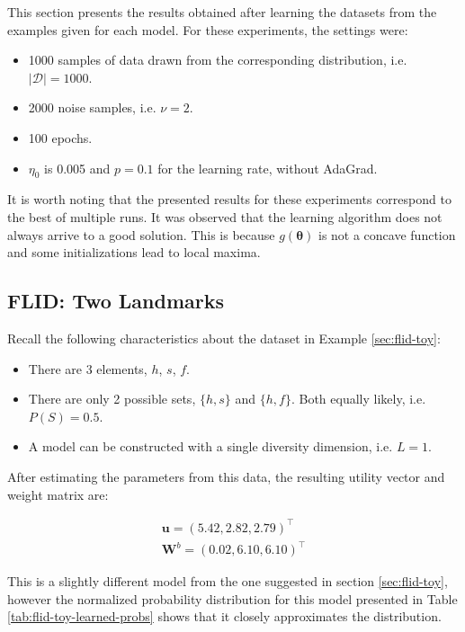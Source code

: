 This section presents the results obtained after learning the datasets from the examples given for each model. For these experiments, the settings were:

\begin{itemize}
  \item 1000 samples of data drawn from the corresponding distribution, i.e. $|\mathcal{D}| = 1000$.
  \item 2000 noise samples, i.e. $\nu = 2$.
  \item 100 epochs.
  \item $\eta_{0}$ is 0.005 and $p = 0.1$ for the learning rate, without AdaGrad.
\end{itemize}

It is worth noting that the presented results for these experiments correspond to the best of multiple runs. It was observed that the learning algorithm does not always arrive to a good solution. This is because $g(\boldsymbol{\theta})$ is not a concave function and some initializations lead to local maxima.

\subsection{FLID: Two Landmarks}

Recall the following characteristics about the dataset in Example \ref{sec:flid-toy}:

\begin{itemize}
  \item There are 3 elements, $h$, $s$, $f$.
  \item There are only 2 possible sets, $\{h,s\}$ and $\{h,f\}$. Both equally likely, i.e. $P(S) = 0.5$.
  \item A model can be constructed with a single diversity dimension, i.e. $L=1$.
\end{itemize}

After estimating the parameters from this data, the resulting utility vector and weight matrix are:

\begin{align*}
  \mathbf{u} = \left(5.42,2.82,2.79\right)^{\intercal} \\
  \mathbf{W}^{b} = \left(0.02, 6.10, 6.10\right)^{\intercal}
\end{align*}

This is a slightly different model from the one suggested in section \ref{sec:flid-toy}, however the normalized probability distribution for this model presented in Table \ref{tab:flid-toy-learned-probs} shows that it closely approximates the distribution.

